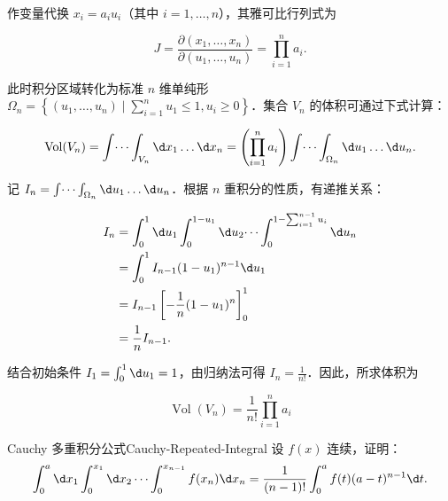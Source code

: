 \begin{solution}
    作变量代换 $x_i = a_i u_i$（其中 $i = 1, \dots, n$），其雅可比行列式为

    \begin{equation}
        J = \frac{\partial(x_1, \dots, x_n)}{\partial(u_1, \dots, u_n)} = \prod_{i=1}^n a_i.
    \end{equation}

    此时积分区域转化为标准 $n$ 维单纯形 $\Omega_n = \left\{ (u_1, \dots, u_n) \mid \sum_{i=1}^n u_1 \le 1, u_i \ge 0 \right\}$．集合 $V_n$ 的体积可通过下式计算：

    \begin{equation}
        \operatorname{Vol}(V_n) = \int \dots \int_{V_n} \d x_1 \dots \d x_n = \left( \prod_{i=1}^n a_i \right) \int \dots \int_{\Omega_n} \d u_1 \dots \d u_n.
    \end{equation}

    记 $I_n = \int \dots \int_{\Omega_n} \d u_1 \dots \d u_n$．根据 $n$ 重积分的性质，有递推关系：

    \begin{equation}
        \begin{aligned}
            I_n & = \int_0^1 \d u_1 \int_0^{1-u_1} \d u_2 \dots \int_0^{1-\sum_{i=1}^{n-1} u_i} \d u_n \\
                & = \int_0^1 I_{n-1}(1-u_1)^{n-1} \d u_1                                               \\
                & = I_{n-1} \left[ -\frac{1}{n} (1-u_1)^n \right]_0^1                                  \\
                & = \frac{1}{n} I_{n-1}.
        \end{aligned}
    \end{equation}

    结合初始条件 $I_1 = \int_0^1 \d u_1 = 1$，由归纳法可得 $I_n = \frac{1}{n!}$．因此，所求体积为

    \begin{equation}
        \boxed{\operatorname{Vol}(V_n) = \frac{1}{n!} \prod_{i=1}^n a_i}
    \end{equation}
\end{solution}

\begin{problem}{Cauchy 多重积分公式}{Cauchy-Repeated-Integral}
    设 $f(x)$ 连续，证明：
    \begin{equation}
        \int_{0}^{a} \d x_1 \int_{0}^{x_1} \d x_2 \cdots \int_{0}^{x_{n-1}} f(x_n) \d x_n = \frac{1}{(n-1)!} \int_{0}^{a} f(t)(a-t)^{n-1} \d t.
    \end{equation}
\end{problem}

